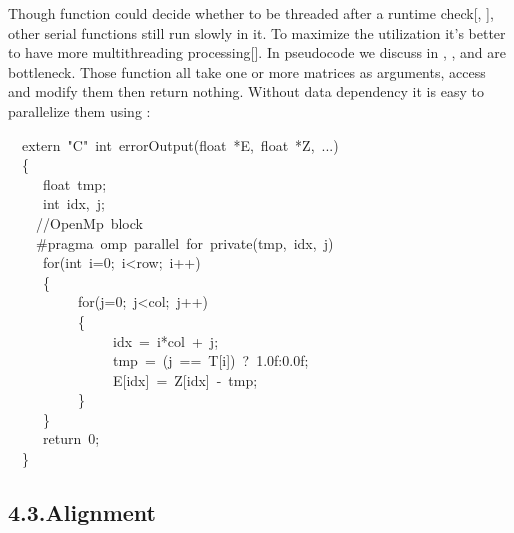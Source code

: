 \documentclass{article}
\begin{document}
\noindent{}Though  function could decide whether to be threaded after a runtime check[, ], other serial functions still run slowly in it. To maximize the utilization it's better to have more multithreading processing[]. In pseudocode we discuss in , ,  and  are bottleneck. Those function all take one or more matrices as arguments, access and modify them then return nothing. Without data dependency it is easy to parallelize them using :%
\begin{mdpre}%
\noindent~~extern~{"}{C}{"}~{int}~errorOutput({float}~*{E},~{float}~*{Z},~...)\\
~~\{\\
~~~~~{float}~tmp;\\
~~~~~{int}~idx,~j;\\
~~~~{//OpenMp~block~}\\
~~~~\#pragma~omp~parallel~{for}~{private}(tmp,~idx,~j)\\
~~~~~{for}({int}~i={0};~i\textless{}row;~i++)\\
~~~~~\{\\
~~~~~~~~~~{for}(j={0};~j\textless{}col;~j++)\\
~~~~~~~~~~\{\\
~~~~~~~~~~~~~~~idx~=~i*col~+~j;\\
~~~~~~~~~~~~~~~tmp~=~(j~==~{T}[i])~?~{1.0f}:{0.0f};\\
~~~~~~~~~~~~~~~{E}[idx]~=~{Z}[idx]~-~tmp;\\
~~~~~~~~~~\}\\
~~~~~\}\\
~~~~~{return}~{0};\\
~~\}\\
\end{mdpre}
\subsection{4.3.\hspace*{0.5em}Alignment}\label{sec-alignment}%
\end{document}

